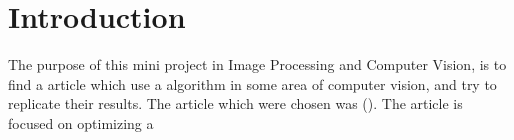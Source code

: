 \section{Introduction}
\label{Introduction}
The purpose of this mini project in Image Processing and Computer Vision, is to find a article which use a algorithm in some area of computer vision, and try to replicate their results. The article which were chosen was (). The article is focused on optimizing a 